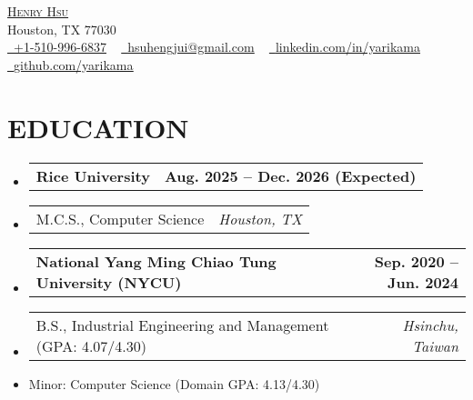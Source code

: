 \documentclass[letterpaper,11pt]{article}
\makeatletter
\newcommand{\mylocation}{Houston, TX 77030}
\newcommand{\resumeItem}[1]{
  \item\small{#1}
}
\newcommand{\resumeSubheadingnull}[2]{
  \item
    \begin{tabular*}{1.0\textwidth}[t]{l@{\extracolsep{\fill}}r}
      \textbf{#1} & \textbf{\small #2} \\
    \end{tabular*}\vspace{3pt}
}
\newcommand{\resumeSubItema}[2]{
  \item
    \begin{tabular*}{1.0\textwidth}[t]{l@{\extracolsep{\fill}}r}
      \small#1 & \textit{\small #2} \\
    \end{tabular*}
}
\newcommand{\resumeSubItem}[1]{\resumeItem{#1}}
\newcommand{\resumeSubHeadingListStart}{\begin{itemize}[leftmargin=0.0in, label={}]}
\newcommand{\resumeSubHeadingListEnd}{\end{itemize}}
\makeatother
\begin{document}

\begin{center}
	{\Huge \scshape \href{https://yarikama.world}{Henry Hsu}} \\
    {\small\color{gray} \mylocation} \\
	\href{tel:+1-510-996-6837}{\raisebox{-0.2\height}\faPhone\  \underline{+1-510-996-6837}} ~
	\href{mailto:hsuhengjui@gmail.com}{\raisebox{-0.2\height}\faEnvelope\  \underline{hsuhengjui@gmail.com}} ~
	\href{https://linkedin.com/in/yarikama/}{\raisebox{-0.2\height}\faLinkedin\ \underline{linkedin.com/in/yarikama}}  ~
	\href{https://github.com/yarikama}{\raisebox{-0.2\height}\faGithub\ \underline{github.com/yarikama}}
	\vspace{-4pt}
\end{center}
\section{EDUCATION}
\resumeSubHeadingListStart
\resumeSubheadingnull
{Rice University}{Aug. 2025 -- Dec. 2026 (Expected)}{}{}
\vspace{-20pt}
\resumeSubItema{M.C.S., Computer Science}{Houston, TX}
\vspace{-15pt}
\resumeSubHeadingListEnd


\resumeSubHeadingListStart
\resumeSubheadingnull
{National Yang Ming Chiao Tung University (NYCU)}{Sep. 2020 -- Jun. 2024}
\vspace{-20pt}
\resumeSubItema{B.S., Industrial Engineering and Management (GPA: 4.07/4.30)}{Hsinchu, Taiwan}
\resumeSubItem{Minor: Computer Science (Domain GPA: 4.13/4.30)}
\resumeSubHeadingListEnd


\vspace{-6pt}



\end{document}
